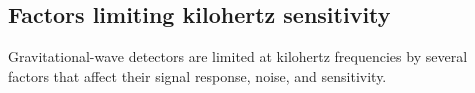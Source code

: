 

\subsection{Factors limiting kilohertz sensitivity}
\label{sec:intro_factors_limiting_kHz}

Gravitational-wave detectors are limited at kilohertz frequencies by several factors that affect their signal response, noise, and sensitivity.


